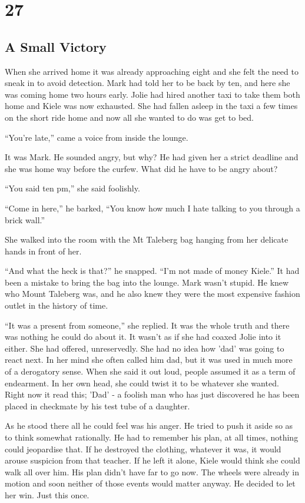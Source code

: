\chapter{27}
\section{A Small Victory}


When she arrived home it was already approaching eight and she felt the need to sneak in to avoid detection.  Mark had told her to be back by ten, and here she was coming home two hours early.  Jolie had hired another taxi to take them both home and Kiele was now exhausted.  She had fallen asleep in the taxi a few times on the short ride home and now all she wanted to do was get to bed.

``You're late,'' came a voice from inside the lounge.  

It was Mark.  He sounded angry, but why?  He had given her a strict deadline and she was home way before the curfew.  What did he have to be angry about?

``You said ten pm,'' she said foolishly.

``Come in here,'' he barked, ``You know how much I hate talking to you through a brick wall.''

She walked into the room with the Mt Taleberg bag hanging from her delicate hands in front of her.  

``And what the heck is that?'' he snapped.  ``I'm not made of money Kiele.''  It had been a mistake to bring the bag into the lounge.  Mark wasn't stupid.  He knew who Mount Taleberg was, and he also knew they were the most expensive fashion outlet in the history of time.  

``It was a present from someone,'' she replied.  It was the whole truth and there was nothing he could do about it.  It wasn't as if she had coaxed Jolie into it either.  She had offered, unreservedly.  She had no idea how 'dad' was going to react next.  In her mind she often called him dad, but it was used in much more of a derogatory sense.  When she said it out loud, people assumed it as a term of endearment.  In her own head, she could twist it to be whatever she wanted.  Right now it read this; 'Dad' - a foolish man who has just discovered he has been placed in checkmate by his test tube of a daughter.

As he stood there all he could feel was his anger.  He tried to push it aside so as to think somewhat rationally.  He had to remember his plan, at all times, nothing could jeopardise that.  If he destroyed the clothing, whatever it was, it would arouse suspicion from that teacher.  If he left it alone, Kiele would think she could walk all over him.  His plan didn't have far to go now.  The wheels were already in motion and soon neither of those events would matter anyway.  He decided to let her win.  Just this once.


